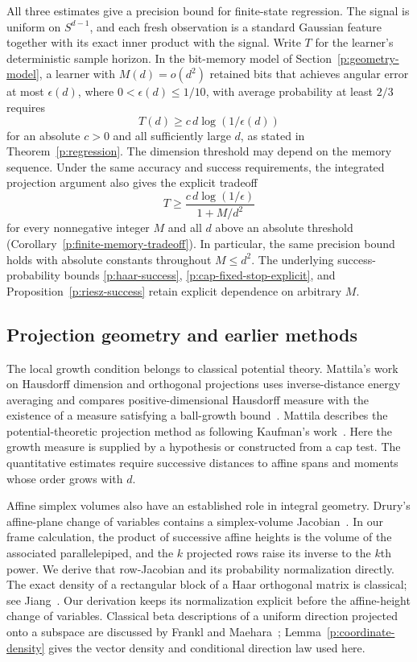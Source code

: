All three estimates give a precision bound for finite-state regression.
The signal is uniform on \(S^{d-1}\), and each fresh observation is a
standard Gaussian feature together with its exact inner product with the
signal. Write \(T\) for the learner's deterministic sample horizon.
In the bit-memory model of Section~\ref{p:geometry-model}, a learner
with \(M(d)=o(d^2)\) retained bits that achieves angular error at most
\(\epsilon(d)\), where \(0<\epsilon(d)\le1/10\), with average probability
at least \(2/3\)
requires
\[
 T(d)\ge c\,d\log(1/\epsilon(d))
\]
for an absolute \(c>0\) and all sufficiently large \(d\), as stated in
Theorem~\ref{p:regression}. The dimension threshold may depend on the
memory sequence. Under the same accuracy and success requirements, the
integrated projection argument also gives the explicit tradeoff
\[
 T\ge \frac{c\,d\log(1/\epsilon)}{1+M/d^2}
\]
for every nonnegative integer \(M\) and all \(d\) above an absolute
threshold (Corollary~\ref{p:finite-memory-tradeoff}). In particular, the
same precision bound holds with absolute constants throughout \(M\le d^2\).
The underlying success-probability bounds
\eqref{p:haar-success}, \eqref{p:cap-fixed-stop-explicit}, and
Proposition~\ref{p:riesz-success} retain explicit dependence on arbitrary
\(M\).

\subsection{Projection geometry and earlier methods}

The local growth condition belongs to classical potential theory.
Mattila's work on Hausdorff dimension and orthogonal projections uses
inverse-distance energy averaging and compares positive-dimensional
Hausdorff measure with the existence of a measure satisfying a ball-growth
bound~\cite[Lemma~5.1, p.~236, and Theorem~5.4, p.~237]{Mattila1975}.
Mattila describes the potential-theoretic projection method as following
Kaufman's work~\cite[Introduction, p.~227]{Mattila1975}. Here the growth
measure is supplied by a hypothesis or constructed from a cap test. The quantitative estimates require successive
distances to affine spans and moments whose order grows with \(d\).

Affine simplex volumes also have an established role in integral geometry.
Drury's affine-plane change of variables contains a simplex-volume
Jacobian~\cite[Lemma~1, pp.~497--498]{Drury1984}. In our frame calculation,
the product of successive affine heights is the volume of the associated
parallelepiped, and the \(k\) projected rows raise its inverse to the
\(k\)th power. We derive that row-Jacobian and its probability normalization
directly. The exact density of a rectangular block of a Haar orthogonal
matrix is classical; see Jiang~\cite[Lemma~2.5]{Jiang2006}.
Our derivation keeps its normalization explicit before the affine-height
change of variables. Classical beta descriptions of a uniform direction projected
onto a subspace are discussed by Frankl and
Maehara~\cite{FranklMaehara1990}; Lemma~\ref{p:coordinate-density}
gives the vector density and conditional direction law used here.

